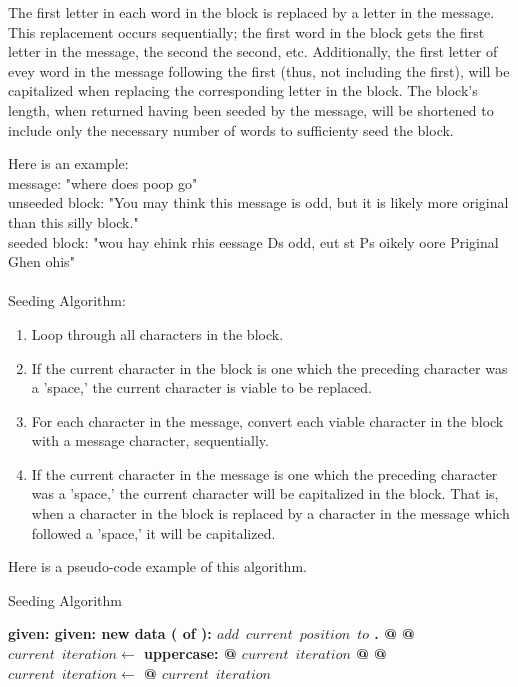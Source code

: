 \documentclass[12]{article}
\begin{document}
	The first letter in each word in the block is replaced by a letter in the message. This replacement occurs sequentially; the first word in the block gets the first letter in the message, the second the second, etc. Additionally, the first letter of evey word in the message following the first (thus, not including the first), will be capitalized when replacing the corresponding letter in the block. The block's length, when returned having been seeded by the message, will be shortened to include only the necessary number of words to sufficienty seed the block.
	
   Here is an example:\\
message: "where does poop go"\\
unseeded block: "You may think this message is odd, but it is likely more original than this silly block."\\
seeded block: "wou hay ehink rhis eessage Ds odd, eut st Ps oikely oore Priginal Ghen ohis"\\
\\
Seeding Algorithm:
\begin{enumerate}
\item Loop through all characters in the block.
\item If the current character in the block is one which the preceding character was a 'space,' the current character is viable to be replaced.
\item For each character in the message, convert each viable character in the block with a message character, sequentially.
\item If the current character in the message is one which the preceding character was a 'space,' the current character will be capitalized in the block. That is, when a character in the block is replaced by a character in the message which followed a 'space,' it will be capitalized.
\end{enumerate}

	Here is a pseudo-code example of this algorithm.
\begin{algorithm}
\caption{Seeding Algorithm}\label{euclid}
\begin{algorithmic}
\State \bf{given:} 
\State \bf{given:} 
\State \bf{new data ( \bf{of} \bf{):}} 
		\State $add\,\,\,current\,\,\,position\,\,\,to$ .
	\EndIf
\EndFor
{}
		\State {} @  @ $current\,\,\,iteration\gets$ \bf{uppercase:}   @ $current\,\,\,iteration$
	\Else
		\State {} @  @ $current\,\,\,iteration\gets$  @ $current\,\,\,iteration$
	\EndIf
\EndFor
\EndProcedure
\end{algorithmic}
\end{algorithm}
\end{document}
